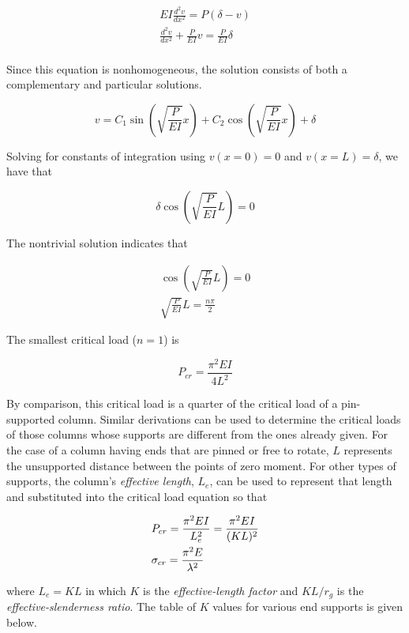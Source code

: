 \documentclass[
10pt,
a4paper,
openany,
svgnames,
]{book}
\begin{document}
\begin{gather*}
  EI\frac{d^2v}{dx^2} = P(\delta  - v) \\ 
  \frac{d^2v}{dx^2} + \frac{P}{EI}v = \frac{P}{EI}\delta  \\ 
\end{gather*}

Since this equation is nonhomogeneous, the solution consists of both a complementary and particular solutions.

\[v = C_1\sin \left( \sqrt {\frac{P}{EI}} x \right) + C_2\cos \left( \sqrt {\frac{P}{EI}} x \right) + \delta \]

Solving for constants of integration using $v(x = 0) = 0$ and $v(x = L) = \delta$, we have that

\[\delta \cos \left( \sqrt {\frac{P}{EI}} L \right) = 0\]

The nontrivial solution indicates that

\begin{gather*}
  \cos \left( \sqrt {\frac{P}{EI}} L \right) = 0 \\
  \sqrt {\frac{P}{EI}} L = \frac{n\pi }{2}
\end{gather*}

The smallest critical load ($n = 1$) is

\begin{equation}
  P_{cr} = \frac{\pi^2EI}{4L^2}
\end{equation}

By comparison, this critical load is a quarter of the critical load of a pin-supported column. Similar derivations can be used to determine the critical loads of those columns whose supports are different from the ones already given. For the case of a column having ends that are pinned or free to rotate, $L$ represents the unsupported distance between the points of zero moment. For other types of supports, the column’s \emph{effective length}, $L_e$, can be used to represent that length and substituted into the critical load equation so that

\begin{equation} \label{eqn: Euler's formula}
\begin{gathered}
  P_{cr} = \frac{\pi^2EI}{L_e^2} = \frac{\pi ^2EI}{(KL)^2} \hfill \\
  \sigma_{cr} = \frac{\pi ^2E}{\lambda^2} \hfill \\ 
\end{gathered}
\end{equation}

where $L_e = KL$ in which $K$ is the \emph{effective-length factor} and $KL/r_g$ is the \emph{effective-slenderness ratio}. The table of $K$ values for various end supports is given below.
\end{document}
